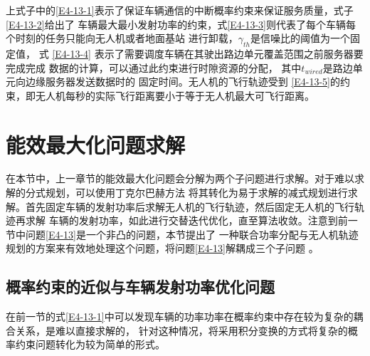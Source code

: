 上式子中的\eqref{E4-13-1}表示了保证车辆通信的中断概率约束来保证服务质量，式子\eqref{E4-13-2}给出了
车辆最大最小发射功率的约束，式\eqref{E4-13-3}则代表了每个车辆每个时刻的任务只能向无人机或者地面基站
进行卸载，$\gamma_{th}$是信噪比的阈值为一个固定值，%
式 \eqref{E4-13-4} 表示了需要调度车辆在其驶出路边单元覆盖范围之前服务器要完成完成
数据的计算，可以通过此约束进行时隙资源的分配，
其中$t_{wired}$是路边单元向边缘服务器发送数据时的
固定时间。无人机的飞行轨迹受到 \eqref{E4-13-5}的约束，即无人机每秒的实际飞行距离要小于等于无人机最大可飞行距离。

\section{能效最大化问题求解}\label{section4-3}
在本节中，上一章节的能效最大化问题会分解为两个子问题进行求解。对于难以求解的分式规划，可以使用丁克尔巴赫方法
将其转化为易于求解的减式规划进行求解。首先固定车辆的发射功率后求解无人机的飞行轨迹，然后固定无人机的飞行轨迹再求解
车辆的发射功率，如此进行交替迭代优化，直至算法收敛。注意到前一节中问题\eqref{E4-13}是一个非凸的问题，本节提出了
一种联合功率分配与无人机轨迹规划的方案来有效地处理这个问题，将问题\eqref{E4-13}解耦成三个子问题 \cite{JointTrajectory9627548}。
\subsection{概率约束的近似与车辆发射功率优化问题}\label{section4-3-1}
在前一节的式\eqref{E4-13-1}中可以发现车辆的功率功率在概率约束中存在较为复杂的耦合关系，是难以直接求解的，
针对这种情况，将采用积分变换的方式将复杂的概率约束问题转化为较为简单的形式。

